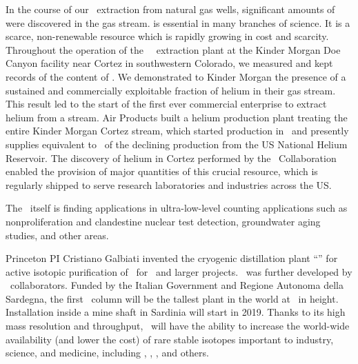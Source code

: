 \begin{compactitem}

\item In the course of our \UAr\ extraction from natural gas wells, significant amounts of  were discovered in the gas stream.   is essential in many branches of science. It is a scarce, non-renewable resource which is rapidly growing in cost and scarcity.  Throughout the operation of the  \DSfs\ \UAr\ extraction plant at the Kinder Morgan Doe Canyon  facility near Cortez in southwestern Colorado, we measured and kept records of the content of .  We demonstrated to Kinder Morgan the presence of a sustained and commercially exploitable fraction of helium in their gas stream.  This result led to the start of the first ever commercial enterprise to extract helium from a  stream.  Air Products built a helium production plant treating the entire Kinder Morgan Cortez  stream, which started production in \UraniaHeStartDate\ and presently supplies  equivalent to \UraniaHeNationalReserveFractionEquivalentRate\ of the declining production from the US National Helium Reservoir.  The discovery of helium in Cortez performed by the \GADMC\ Collaboration enabled the provision of major quantities of this crucial resource, which is regularly shipped to serve research laboratories and industries across the US.

\item The \UAr\ itself is finding applications in ultra-low-level counting applications such as nonproliferation and clandestine nuclear test detection, groundwater aging studies, and other areas.

\item Princeton PI Cristiano Galbiati invented the cryogenic distillation plant ``\Aria'' for active isotopic purification of \UAr\ for \DSks\ and larger projects.  \Aria\ was further developed by \DSfs\ collaborators.  Funded by the Italian Government and Regione Autonoma della Sardegna, the first \Aria\ column will be the tallest plant in the world at \AriaSeruciHeight\ in height.  Installation inside a mine shaft in Sardinia will start in 2019. Thanks to its high mass resolution and throughput, \Aria\ will have the ability to increase the world-wide availability (and lower the cost) of rare stable isotopes important to industry, science, and medicine, including , , , and others.


\end{compactitem}
